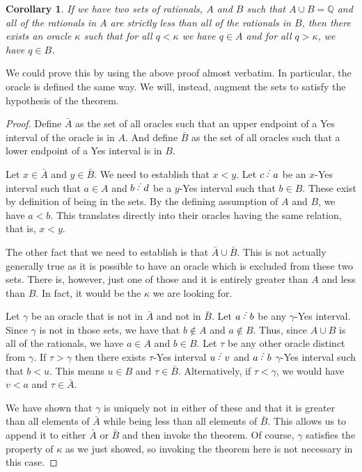 \documentclass[12pt]{article}
\newtheorem{corollary}{Corollary}[subsection]
\begin{document}
\begin{corollary}
    If we have two sets of rationals, $A$ and $B$ such that $A \cup B = \mathbb{Q}$ and all of the rationals in $A$ are strictly less than all of the rationals in $B$, then there exists an oracle $\kappa$ such that for all $q < \kappa$ we have $q \in A$ and for all $q > \kappa$, we have $q \in B$.
\end{corollary}

We could prove this by using the above proof almost verbatim. In particular, the oracle is defined the same way. We will, instead, augment the sets to satisfy the hypothesis of the theorem.

\begin{proof}
    Define $\bar{A}$ as the set of all oracles such that an upper endpoint of a Yes interval of the oracle is in $A$. And define $\bar{B}$ as the set of all oracles such that a lower endpoint of a Yes interval is in $B$. 

    Let $x \in \bar{A}$ and $y \in \bar{B}$. We need to establish that $x < y$. Let $c\lte a$ be an $x$-Yes interval such that $a \in A$ and $b\lte d$ be a $y$-Yes interval such that $b \in B$. These exist by definition of being in the sets. By the defining assumption of $A$ and $B$, we have $a < b$. This translates directly into their oracles having the same relation, that is, $x < y$. 

    The other fact that we need to establish is that $\bar{A} \cup \bar{B}$. This is not actually generally true as it is possible to have an oracle which is excluded from these two sets. There is, however, just one of those and it is entirely greater than $A$ and less than $B$. In fact, it would be the $\kappa$ we are looking for. 

    Let $\gamma$ be an oracle that is not in $\bar{A}$ and not in $\bar{B}$. Let $a\lte b$ be any $\gamma$-Yes interval. Since $\gamma$ is not in those sets, we have that $b \notin A$ and $a \notin B$. Thus, since $A \cup B$ is all of the rationals, we have $a \in A$ and $b \in B$. Let $\tau$ be any other oracle distinct from $\gamma$. If $\tau > \gamma$ then there exists $\tau$-Yes interval $u\lte v$ and $a \lte b$ $\gamma$-Yes interval such that $b < u$. This means $u \in B$ and $\tau \in \bar{B}$. Alternatively, if $\tau < \gamma$, we would have $v < a$ and $\tau \in \bar{A}$.

    We have shown that $\gamma$ is uniquely not in either of these and that it is greater than all elements of $\bar{A}$ while being less than all elements of $\bar{B}$. This allows us to append it to either $\bar{A}$ or $\bar{B}$ and then invoke the theorem. Of course, $\gamma$ satisfies the property of $\kappa$ as we just showed, so invoking the theorem here is not necessary in this case. 
    
\end{proof}
\end{document}
